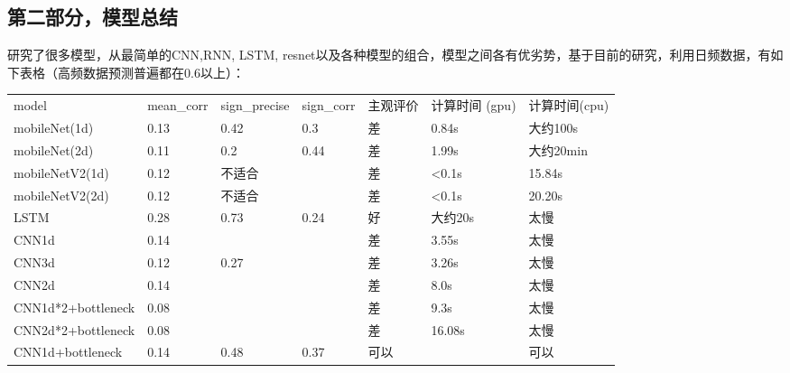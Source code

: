 \documentclass[11pt]{ctexart}
\begin{document}
\subsection{第二部分，模型总结}
研究了很多模型，从最简单的CNN,RNN, LSTM, resnet以及各种模型的组合，模型之间各有优劣势，基于目前的研究，利用日频数据，有如下表格（高频数据预测普遍都在0.6以上）：
\begin{table}[h!]
\begin{tabular}{lllllll}
\cline{4-4}
model             & mean\_corr & \multicolumn{1}{l|}{sign\_precise} &\multicolumn{1}{l|}{sign\_corr} & 主观评价 & 计算时间 (gpu) & 计算时间(cpu)\\ \cline{4-4}
mobileNet(1d)             & 0.13       & 0.42                               & 0.3                            & 差    & 0.84s & 大约100s\\
mobileNet(2d)             & 0.11       & 0.2                               & 0.44                            & 差    & 1.99s & 大约20min\\
mobileNetV2(1d)            & 0.12       & 不适合                               &                             & 差    & \textless{}0.1s & 15.84s\\
mobileNetV2(2d)             & 0.12       & 不适合                               &                             & 差    & \textless{}0.1s & 20.20s\\
LSTM              & 0.28       & 0.73                               & 0.24                            & 好    & 大约20s & 太慢\\
CNN1d       & 0.14       &                                    &                                 & 差   &  3.55s & 太慢\\
CNN3d       & 0.12       & 0.27                                   &                                 & 差   &  3.26s & 太慢\\
CNN2d       & 0.14       &                                    &                                 & 差   &  8.0s & 太慢\\
CNN1d*2+bottleneck            & 0.08       &                                    &                                 & 差   &  9.3s & 太慢\\
CNN2d*2+bottleneck            & 0.08       &                                    &                                 & 差    & 16.08s & 太慢\\
CNN1d+bottleneck            & 0.14       &  0.48                                  & 0.37                                & 可以   &  & 可以\\

\end{tabular}
\end{table}
\end{document}
